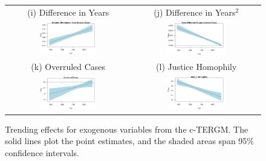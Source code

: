 \documentclass[headsepline=true, abstracton]{scrartcl}
\begin{document}
\begin{figure}[H]
\begin{tabular}{cc}
 (i) Difference in Years & (j) Difference in Years$^2$ \\
\includegraphics[width = 0.475\textwidth, trim= 0.1cm 1cm 0.5cm .45cm,clip=true]{images/yeardiff_coef_trend_linear.pdf} & \includegraphics[width = 0.475\textwidth, trim= 0.1cm 1cm 0.5cm .45cm,clip=true]{images/yeardiffsquare_coef_trend_linear.pdf} \\

 (k) Overruled Cases & (l) Justice Homophily \\
\includegraphics[width = 0.475\textwidth, trim= 0.1cm 1cm 0.5cm .45cm,clip=true]{images/overruled_coef_trend_linear.pdf} & 
\includegraphics[width = 0.475\textwidth, trim= 0.1cm 1cm 0.5cm .45cm,clip=true]{images/justicehomophily_coef_trend_linear.pdf} \\

 \end{tabular}
\caption{Trending effects for exogenous variables from the c-TERGM. The solid lines plot the point estimates, and the shaded areas span 95\% confidence intervals. }
 \label{fig:coeftrends_exo}
\vspace{-.25cm}
\end{figure} 
\end{document}
